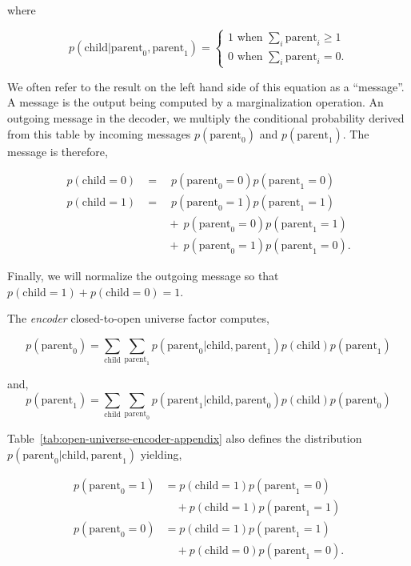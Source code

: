 \documentclass{article}
\begin{document}
where

\begin{equation}
    p(\text{child}| \text{parent}_0, \text{parent}_1) = \begin{cases}
        1 \text{ when } \sum_i \text{parent}_i \geq 1\\
        0 \text{ when } \sum_ i \text{parent}_i = 0.
    \end{cases}
\end{equation}

We often refer to the result on the left hand side of this equation as a ``message''.  A message is the output being computed by a marginalization operation.  An outgoing message in the decoder, we multiply the conditional probability derived from this table by incoming messages $p(\text{parent}_0)$ and $p(\text{parent}_1)$. The message is therefore,

\begin{eqnarray}
    p(\text{child}=0) &=\quad p(\text{parent}_0=0)p(\text{parent}_1=0) \nonumber \\
    p(\text{child}=1)
    &=\quad p(\text{parent}_0=1)p(\text{parent}_1=1) \nonumber \\
    &\qquad+\  p(\text{parent}_0=0)p(\text{parent}_1=1) \nonumber \\
    &\qquad+\  p(\text{parent}_0=1)p(\text{parent}_1=0).
\end{eqnarray}

Finally, we will normalize the outgoing message so that $p(\text{child}=1) + p(\text{child}=0) =1$.

The \emph{encoder} closed-to-open universe factor computes,

\begin{equation}
    p(\text{parent}_0) = \sum_{\text{child}} \sum_{\text{parent}_1} 
    p(\text{parent}_0|\text{child}, \text{parent}_1 ) p(\text{child})p(\text{parent}_1)
\end{equation}

and, 
\begin{equation}
    p(\text{parent}_1) = \sum_{\text{child}} \sum_{\text{parent}_0} 
    p(\text{parent}_1|\text{child}, \text{parent}_0 ) p(\text{child})p(\text{parent}_0)
\end{equation}

Table~\ref{tab:open-universe-encoder-appendix} also defines the distribution $p(\text{parent}_0|\text{child}, \text{parent}_1)$ yielding,

\begin{align}
    p(\text{parent}_0 = 1) &=  
    p(\text{child}=1)p(\text{parent}_1=0) \nonumber \\
    &\quad+ p(\text{child}=1)p(\text{parent}_1=1)\nonumber \\
    p(\text{parent}_0 = 0) &=  
    p(\text{child}=1)p(\text{parent}_1=1) \nonumber \\
    &\quad+ p(\text{child}=0)p(\text{parent}_1=0).
\end{align}
\end{document}
